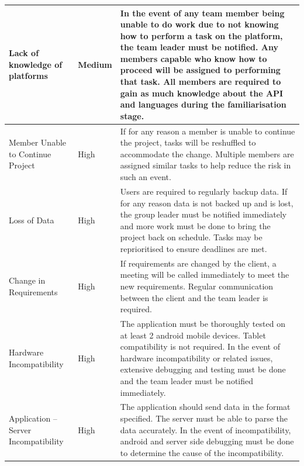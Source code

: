 \documentclass[12pt]{article}
\begin{document}
\begin{longtable}{|p{2.5cm}|p{1.5cm}|p{10cm}|}
\hline 
	Lack of knowledge of platforms & Medium & In the event of any team member being unable to do work due to not knowing how to perform a task on the platform, the team leader must be notified. Any members capable who know how to proceed will be assigned to performing that task. All members are required to gain as much knowledge about the API and languages during the familiarisation stage. \\
\hline 
	Member Unable to Continue Project & High & If for any reason a member is unable to continue the project, tasks will be reshuffled to accommodate the change. Multiple members are assigned similar tasks to help reduce the risk in such an event. \\
\hline
	Loss of Data & High & Users are required to regularly backup data. If for any reason data is not backed up and is lost, the group leader must be notified immediately and more work must be done to bring the project back on schedule. Tasks may be reprioritised to ensure deadlines are met. \\
\hline 
	Change in Requirements & High & If requirements are changed by the client, a meeting will be called immediately to meet the new requirements. Regular communication between the client and the team leader is required. \\
\hline 
	Hardware Incompatibility & High & The application must be thoroughly tested on at least 2 android mobile devices. Tablet compatibility is not required. In the event of hardware incompatibility or related issues, extensive debugging and testing must be done and the team leader must be notified immediately. \\ 
\hline 
	Application – Server Incompatibility & High & The application should send data in the format specified. The server must be able to parse the data accurately. In the event of incompatibility, android and server side debugging must be done to determine the cause of the incompatibility. \\
\hline
\end{longtable}
\newpage
\end{document}
